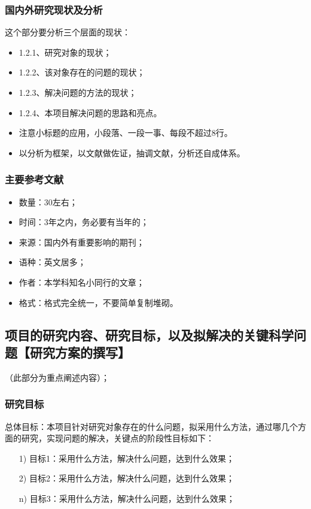 \subsubsection{国内外研究现状及分析}
这个部分要分析三个层面的现状：
\begin{itemize}
\item 1.2.1、研究对象的现状；
\item 1.2.2、该对象存在的问题的现状；
\item 1.2.3、解决问题的方法的现状；
\item 1.2.4、本项目解决问题的思路和亮点。
\item 注意小标题的应用，小段落、一段一事、每段不超过8行。
\item 以分析为框架，以文献做佐证，抽调文献，分析还自成体系。
\end{itemize}


\subsubsection{主要参考文献}
\begin{itemize}
\item 数量：30左右；
\item 时间：3年之内，务必要有当年的；
\item 来源：国内外有重要影响的期刊；
\item 语种：英文居多；
\item 作者：本学科知名小同行的文章；
\item 格式：格式完全统一，不要简单复制堆砌。
\end{itemize}



\subsection{项目的研究内容、研究目标，以及拟解决的关键科学问题【研究方案的撰写】}
（此部分为重点阐述内容）；
\subsubsection{研究目标}
总体目标：本项目针对研究对象存在的什么问题，拟采用什么方法，通过哪几个方面的研究，实现问题的解决，关键点的阶段性目标如下：
\begin{itemize}
\item[1)] 目标1：采用什么方法，解决什么问题，达到什么效果；
\item[2)] 目标2：采用什么方法，解决什么问题，达到什么效果；
\item[n)] 目标3：采用什么方法，解决什么问题，达到什么效果；
\end{itemize}


